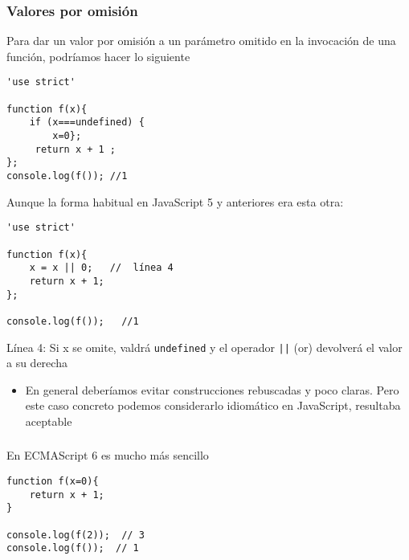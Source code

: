 \documentclass[ucs]{beamer}
\begin{document}
\begin{frame}[fragile]
\frametitle{Valores por omisión}
Para dar un valor por omisión a un parámetro omitido en la invocación
de una función, podríamos hacer lo siguiente

  \begin{scriptsize}
  \begin{verbatim}
'use strict'

function f(x){
    if (x===undefined) {
        x=0};
     return x + 1 ;
};
console.log(f()); //1
  \end{verbatim}
  \end{scriptsize}

\end{frame}

\begin{frame}[fragile]


Aunque la forma habitual en JavaScript 5 y anteriores era esta otra:
  \begin{scriptsize}
  \begin{verbatim}
'use strict'

function f(x){
    x = x || 0;   //  línea 4
    return x + 1;
};

console.log(f());   //1
  \end{verbatim}
  \end{scriptsize}

Línea 4:
Si x se omite, valdrá
\verb|undefined|
y el operador \verb"||" (or) devolverá
el valor a su derecha


    \begin{itemize}
    \item
En general deberíamos evitar construcciones rebuscadas y poco claras.
Pero este caso concreto podemos considerarlo idiomático en JavaScript,
resultaba aceptable
    \end{itemize}

\end{frame}


\begin{frame}[fragile]
\frametitle{}
En ECMAScript 6 es mucho más sencillo

  \begin{scriptsize}
  \begin{verbatim}
function f(x=0){
    return x + 1;
}

console.log(f(2));  // 3
console.log(f());  // 1
  \end{verbatim}
  \end{scriptsize}

\end{frame}
\end{document}
